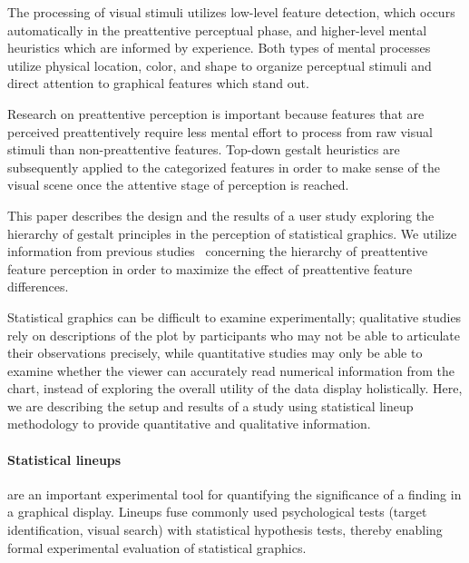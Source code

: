 \documentclass[12pt]{article}\usepackage[]{graphicx}\usepackage[]{color}
\begin{document}
The processing of visual stimuli utilizes low-level feature detection, which occurs automatically in the preattentive perceptual phase, and higher-level mental heuristics which are informed by experience. Both types of mental processes utilize physical location, color, and shape  to organize perceptual stimuli and direct attention to graphical features which stand out. 

Research on preattentive perception is important because features that are perceived preattentively require less mental effort to process from raw visual stimuli than non-preattentive features. Top-down gestalt heuristics are subsequently applied to the categorized features in order to make sense of the visual scene once the attentive stage of perception is reached. 


This paper describes the design and the results of a user study exploring the hierarchy of gestalt principles in the perception of statistical graphics. We utilize information from previous studies~\citep{heer:2014, robinson:03, healey1996high} concerning the hierarchy of preattentive feature perception in order to maximize the effect of preattentive feature differences. 


Statistical graphics can be difficult to examine experimentally; qualitative studies rely on descriptions of the plot by participants who may not be able to articulate their observations precisely, while quantitative studies may only be able to examine whether the viewer can accurately read numerical information from the chart, instead of exploring the overall utility of the data display holistically. Here, we are describing the setup and results of a study using statistical lineup methodology to provide quantitative and qualitative information.

\paragraph{Statistical lineups} 
are an important experimental tool for quantifying the significance of a finding in a graphical display. %
Lineups fuse commonly used psychological tests (target identification, visual search) \citep{visualreasoning} with statistical hypothesis tests, thereby enabling %
formal experimental evaluation of statistical graphics. 
\end{document}
